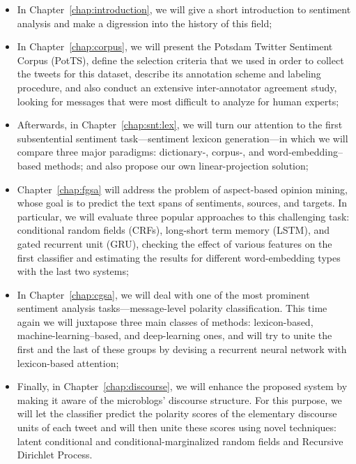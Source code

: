 \begin{itemize}
\item In Chapter~\ref{chap:introduction}, we will give a short
  introduction to sentiment analysis and make a digression into the
  history of this field;

\item In Chapter~\ref{chap:corpus}, we will present the Potsdam
  Twitter Sentiment Corpus (PotTS), define the selection criteria that
  we used in order to collect the tweets for this dataset, describe
  its annotation scheme and labeling procedure, and also conduct an
  extensive inter-annotator agreement study, looking for messages that
  were most difficult to analyze for human experts;

\item Afterwards, in Chapter~\ref{chap:snt:lex}, we will turn our
  attention to the first subsentential sentiment task---sentiment
  lexicon generation---in which we will compare three major paradigms:
  dictionary-, corpus-, and word-embedding--based methods; and also
  propose our own linear-projection solution;

\item Chapter~\ref{chap:fgsa} will address the problem of aspect-based
  opinion mining, whose goal is to predict the text spans of
  sentiments, sources, and targets.  In particular, we will evaluate
  three popular approaches to this challenging task: conditional
  random fields (CRFs), long-short term memory (LSTM), and gated
  recurrent unit (GRU), checking the effect of various features on the
  first classifier and estimating the results for different
  word-embedding types with the last two systems;

\item In Chapter~\ref{chap:cgsa}, we will deal with one of the most
  prominent sentiment analysis tasks---message-level polarity
  classification.  This time again we will juxtapose three main
  classes of methods: lexicon-based, machine-learning--based, and
  deep-learning ones, and will try to unite the first and the last of
  these groups by devising a recurrent neural network with
  lexicon-based attention;

\item Finally, in Chapter~\ref{chap:discourse}, we will enhance the
  proposed system by making it aware of the microblogs' discourse
  structure.  For this purpose, we will let the classifier predict the
  polarity scores of the elementary discourse units of each tweet and
  will then unite these scores using novel techniques: latent
  conditional and conditional-marginalized random fields and Recursive
  Dirichlet Process.
\end{itemize}
